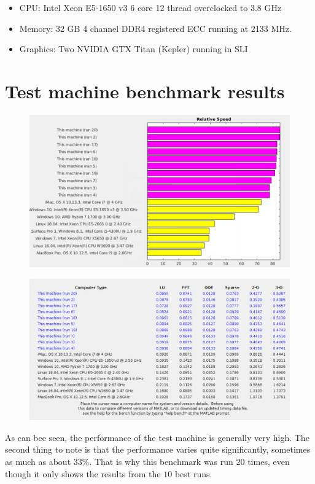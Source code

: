 \begin{itemize}
    \item CPU: Intel Xeon E5-1650 v3 6 core 12 thread overclocked to 3.8 GHz
    \item Memory: 32 GB 4 channel DDR4 registered ECC running at 2133 MHz.
    \item Graphics: Two NVIDIA GTX Titan (Kepler) running in SLI
\end{itemize}

\newpage

\section{Test machine benchmark results}

\begin{figure}[h!]
    \includegraphics[width=\linewidth]{figures/Performance_1.eps}
    \centering
\end{figure}

\begin{figure}[h!]
    \includegraphics[width=\linewidth]{figures/Performance_2.eps}
    \centering
\end{figure}

\noindent As can bee seen, the performance of the test machine is generally very high. The second thing to note is that the performance varies quite significantly, sometimes as much as about $33 \%$. That is why this benchmark was run $20$ times, even though it only shows the results from the $10$ best runs.